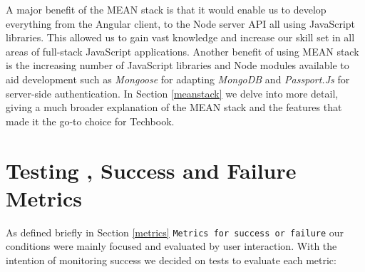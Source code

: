 A major benefit of the MEAN stack is that it would enable us to develop everything from the Angular client, to the Node server API all using JavaScript libraries. This allowed us to gain vast knowledge and increase our skill set in all areas of full-stack JavaScript applications. Another benefit of using MEAN stack is the increasing number of JavaScript libraries and Node modules available to aid development such as \textit{Mongoose} for adapting \textit{MongoDB} and \textit{Passport.Js} for server-side authentication. In Section \ref{meanstack} we delve into more detail, giving a much broader explanation of the MEAN stack and the features that made it the go-to choice for Techbook.


\section{Testing , Success and Failure Metrics} 
As defined briefly in Section \ref{metrics} \texttt{Metrics for success or failure} our conditions were mainly focused and evaluated by user interaction. With the intention of monitoring  success we decided on tests to evaluate each metric:

